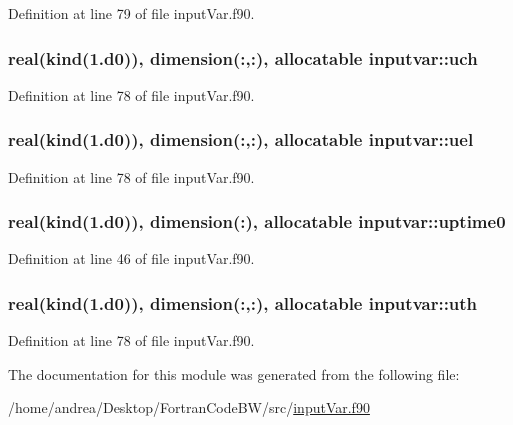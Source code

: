 Definition at line 79 of file input\-Var.\-f90.

\hypertarget{classinputvar_a889ca8b7a94ff88ec05a082dd2470ac3}{
\subsubsection[{uch}]{\setlength{\rightskip}{0pt plus 5cm}real(kind(1.d0)), dimension(\-:,\-:), allocatable inputvar\-::uch}}\label{classinputvar_a889ca8b7a94ff88ec05a082dd2470ac3}


Definition at line 78 of file input\-Var.\-f90.

\hypertarget{classinputvar_a9833eea2b0f2ee5ab1a1927826656d05}{
\subsubsection[{uel}]{\setlength{\rightskip}{0pt plus 5cm}real(kind(1.d0)), dimension(\-:,\-:), allocatable inputvar\-::uel}}\label{classinputvar_a9833eea2b0f2ee5ab1a1927826656d05}


Definition at line 78 of file input\-Var.\-f90.

\hypertarget{classinputvar_a3e87ba90459e069a492fde778f06b6a3}{
\subsubsection[{uptime0}]{\setlength{\rightskip}{0pt plus 5cm}real(kind(1.d0)), dimension(\-:), allocatable inputvar\-::uptime0}}\label{classinputvar_a3e87ba90459e069a492fde778f06b6a3}


Definition at line 46 of file input\-Var.\-f90.

\hypertarget{classinputvar_ace89e7bc6ca01804a1f664e9faec7d0c}{
\subsubsection[{uth}]{\setlength{\rightskip}{0pt plus 5cm}real(kind(1.d0)), dimension(\-:,\-:), allocatable inputvar\-::uth}}\label{classinputvar_ace89e7bc6ca01804a1f664e9faec7d0c}


Definition at line 78 of file input\-Var.\-f90.



The documentation for this module was generated from the following file\-:\begin{DoxyCompactItemize}
\item 
/home/andrea/\-Desktop/\-Fortran\-Code\-B\-W/src/\hyperlink{input_var_8f90}{input\-Var.\-f90}\end{DoxyCompactItemize}
